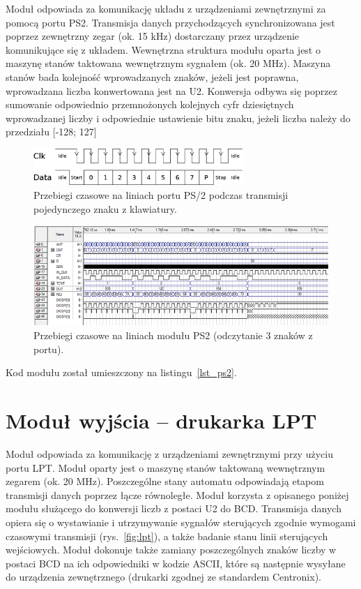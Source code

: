 \documentclass[a4paper,12pt]{report}
\begin{document}
Moduł odpowiada za komunikację układu z urządzeniami zewnętrznymi za pomocą portu PS2. Transmisja danych przychodzących synchronizowana jest poprzez zewnętrzny zegar (ok. 15 kHz) dostarczany przez urządzenie komunikujące się z układem. Wewnętrzna struktura modułu oparta jest o maszynę stanów taktowana wewnętrznym sygnałem (ok. 20 MHz).  Maszyna stanów bada kolejność wprowadzanych znaków, jeżeli jest poprawna, wprowadzana liczba konwertowana jest na U2. Konwersja odbywa się poprzez sumowanie odpowiednio przemnożonych kolejnych cyfr dziesiętnych wprowadzanej liczby i odpowiednie ustawienie bitu znaku, jeżeli liczba należy do przedziału [-128; 127]

\begin{figure}[h]
\centering
\includegraphics[width=8cm]{./pict/PS2.png}
\caption{Przebiegi czasowe na liniach portu PS/2 podczas transmisji pojedynczego znaku z klawiatury.}
\label{fig:ps2}
\end{figure}

\begin{figure}[h]
\centering
\includegraphics[width=16cm]{./pict/PS2_sim.png}
\caption{Przebiegi czasowe na liniach modułu PS2 (odczytanie 3 znaków z portu).}
\label{fig:ps2_sim}
\end{figure}

Kod modułu został umieszczony na listingu~\ref{lst_ps2}.

\section{Moduł wyjścia -- drukarka LPT}
Moduł odpowiada za komunikację z urządzeniami zewnętrznymi przy użyciu portu LPT. Moduł oparty jest o maszynę stanów taktowaną wewnętrznym zegarem (ok. 20 MHz). Poszczególne stany automatu odpowiadają etapom transmisji danych poprzez łącze równoległe. Moduł korzysta z opisanego poniżej modułu służącego do konwersji liczb z postaci U2 do BCD. Transmisja danych opiera się o wystawianie i utrzymywanie sygnałów sterujących zgodnie wymogami czasowymi transmisji (rys.~\ref{fig:lpt}), a także badanie stanu linii sterujących wejściowych. Moduł dokonuje także zamiany poszczególnych znaków liczby w postaci BCD na ich odpowiedniki w kodzie ASCII, które są następnie wysyłane do urządzenia zewnętrznego (drukarki zgodnej ze standardem Centronix).
\end{document}
